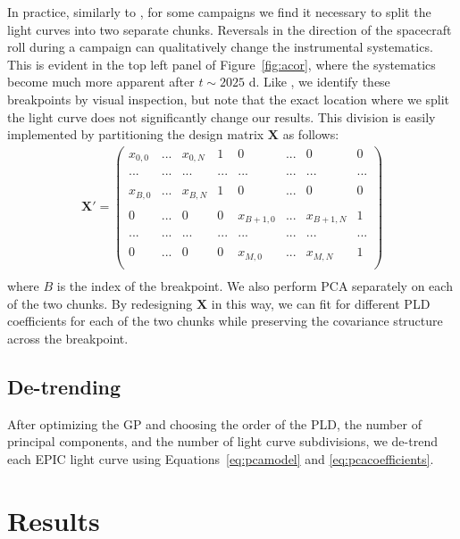\documentclass[]{emulateapj}
\begin{document}
In practice, similarly to \cite{AIG16}, for some campaigns
we find it necessary to split the light curves into two separate chunks. Reversals in
the direction of the spacecraft roll during a campaign can qualitatively change the instrumental
systematics. This is evident in the top left panel of Figure~\ref{fig:acor}, where the systematics
become much more apparent after $t \sim 2025$ d. Like \cite{AIG16}, we identify these breakpoints
by visual inspection, but note that the exact location where we split the light curve does not
significantly change our results. This division is easily implemented by partitioning the design
matrix $\mathbf{X}$ as follows:
\begin{align}
\label{eq:designmatrixsplit}
\mathbf{X'} =  
\begin{pmatrix}
x_{0,0} & ... & x_{0,N} & 1 & 0 & ... & 0 & 0\\
\\
... & ... & ... & ... & ... & ... & ... & ...\\
\\
x_{B,0} & ... & x_{B,N} & 1 & 0 & ... & 0 & 0\\
\\
0 & ... & 0 & 0 & x_{B+1,0} & ... & x_{B+1,N} & 1\\
\\
... & ... & ... & ... & ... & ... & ... & ...\\
\\
0 & ... & 0 & 0 & x_{M,0} & ... & x_{M,N} & 1\\
\end{pmatrix}\nonumber\\
\end{align}
where $B$ is the index of the breakpoint. We also perform PCA separately on each of the 
two chunks. By redesigning $\mathbf{X}$ in this way, we can fit for different PLD 
coefficients for each of the two chunks while preserving the covariance structure 
across the breakpoint.

\subsection{De-trending}
After optimizing the GP and choosing the order of the PLD, the number of principal components, and the 
number of light curve subdivisions, we de-trend each EPIC light curve using
Equations~\ref{eq:pcamodel} and \ref{eq:pcacoefficients}.

\section{Results}
\label{sec:results}
\end{document}
